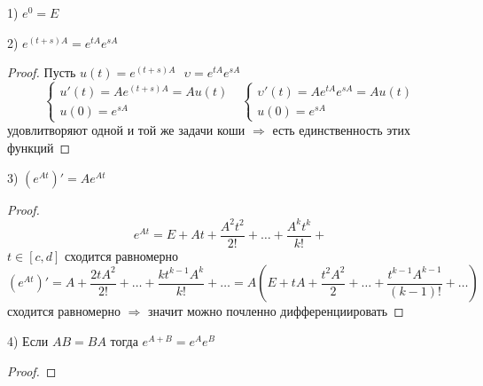 \begin{block}[Свойства]
  1) $e^0 = E$

  2) $e^{(t+s)A} = e^{tA} e^{sA}$

  \begin{proof}
    Пусть $u(t) = e^{(t+s)A} ~~~ \upsilon = e^{tA} e^{sA}$
    $$
    \left\{
    \begin{array}{l}
      u'(t) = A e^{(t+s)A} = Au(t) \\
      u(0) = e^{sA}
    \end{array}
    \right. ~~~
    \left\{
    \begin{array}{l}
      \upsilon'(t) = A e^{tA} e^{sA}= Au(t) \\
      u(0) = e^{sA}
    \end{array}
    \right.
    $$
    удовлитворяют одной и той же задачи коши $\Rightarrow$ есть единственность
    этих функций
  \end{proof}

  3) $(e^{At})' = A e^{At}$

  \begin{proof}
    $$
    e^{At} = E + At + \frac{A^2t^2}{2!} + \ldots + \frac{A^k t^k}{k!} +
    $$
    $t \in [c,d]$ сходится равномерно
    $$
    (e^{At})' = A + \frac{2tA^2}{2!} + \ldots + \frac{kt^{k-1}A^k}{k!} +
    \ldots = A\left(E + tA + \frac{t^2A^2}{2} + \ldots +
    \frac{t^{k-1}A^{k-1}}{(k-1)!} + \ldots\right)
    $$
    сходится равномерно $\Rightarrow$ значит можно почленно дифференциировать
  \end{proof}

  4) Если $AB = BA$ тогда $e^{A+B} = e^A e^B$

  \begin{proof}
  \end{proof}
\end{block}
